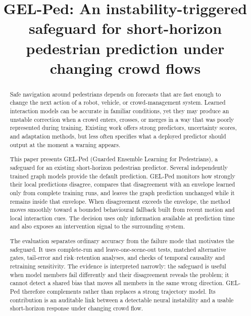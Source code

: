 
\title{GEL-Ped: An instability-triggered safeguard for short-horizon pedestrian prediction under changing crowd flows}

\begin{abstract}
Safe navigation around pedestrians depends on forecasts that are fast enough to change the next action of a robot, vehicle, or crowd-management system. Learned interaction models can be accurate in familiar conditions, yet they may produce an unstable correction when a crowd enters, crosses, or merges in a way that was poorly represented during training. Existing work offers strong predictors, uncertainty scores, and adaptation methods, but less often specifies what a deployed predictor should output at the moment a warning appears.

This paper presents GEL-Ped (Guarded Ensemble Learning for Pedestrians), a safeguard for an existing short-horizon pedestrian predictor. Several independently trained graph models provide the default prediction. GEL-Ped monitors how strongly their local predictions disagree, compares that disagreement with an envelope learned only from complete training runs, and leaves the graph prediction unchanged while it remains inside that envelope. When disagreement exceeds the envelope, the method moves smoothly toward a bounded behavioural fallback built from recent motion and local interaction cues. The decision uses only information available at prediction time and also exposes an intervention signal to the surrounding system.

The evaluation separates ordinary accuracy from the failure mode that motivates the safeguard. It uses complete-run and leave-one-scene-out tests, matched alternative gates, tail-error and risk--retention analyses, and checks of temporal causality and retraining sensitivity. The evidence is interpreted narrowly: the safeguard is useful when model members fail differently and their disagreement reveals the problem; it cannot detect a shared bias that moves all members in the same wrong direction. GEL-Ped therefore complements rather than replaces a strong trajectory model. Its contribution is an auditable link between a detectable neural instability and a usable short-horizon response under changing crowd flow.
\end{abstract}

